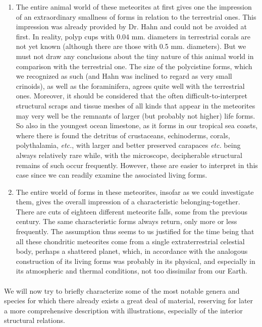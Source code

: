 \documentclass[a4paper, 12pt, oneside]{article}
\begin{document}
\begin{enumerate}
\item The entire animal world of these meteorites at first gives one the impression of an extraordinary smallness of forms in relation to the terrestrial ones. This impression was already provided by Dr. Hahn and could not be avoided at first. In reality, polyp cups with 0.04 mm. diameters in terrestrial corals are not yet known (although there are those with 0.5 mm. diameters). But we must not draw any conclusions about the tiny nature of this animal world in comparison with the terrestrial one. The size of the polycistine forms, which we recognized as such (and Hahn was inclined to regard as very small crinoids), as well as the foraminifera, agrees quite well with the terrestrial ones. Moreover, it should be considered that the often difficult-to-interpret structural scraps and tissue meshes of all kinds that appear in the meteorites may very well be the remnants of larger (but probably not higher) life forms. So also in the youngest ocean limestone, as it forms in our tropical sea coasts, where there is found the detritus of crustaceans, echinoderms, corals, polythalamia, \emph{etc.}, with larger and better preserved carapaces \emph{etc.} being always relatively rare while, with the microscope, decipherable structural remains of such occur frequently. However, these are easier to interpret in this case since we can readily examine the associated living forms.

\item The entire world of forms in these meteorites, insofar as we could investigate them, gives the overall impression of a characteristic belonging-together. There are cuts of eighteen different meteorite falls, some from the previous century. The same characteristic forms always return, only more or less frequently. The assumption thus seems to us justified for the time being that all these chondritic meteorites come from a single extraterrestrial celestial body, perhaps a shattered planet, which, in accordance with the analogous construction of its living forms was probably in its physical, and especially in its atmospheric and thermal conditions, not too dissimilar from our Earth.
\end{enumerate}
\paragraph*{}
We will now try to briefly characterize some of the most notable genera and species for which there already exists a great deal of material, reserving for later a more comprehensive description with illustrations, especially of the interior structural relations.
\clearpage
\end{document}

